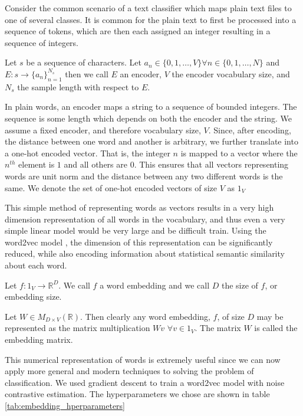 Consider the common scenario of a text classifier which maps plain text files to one of several classes.  It is common for the plain text to first be processed into a sequence of tokens, which are then each assigned an integer resulting in a sequence of integers.

\begin{definition}
Let $s$ be a sequence of characters.  Let $a_n \in \{0,1,\dots,V\} \forall n \in \{0,1,\dots,N\}$ and $E:s\rightarrow \{a_n\}_{n=1}^{N_s}$ then we call $E$ an encoder, $V$ the encoder vocabulary size, and $N_s$ the sample length with respect to $E$.
\end{definition}

In plain words, an encoder maps a string to a sequence of bounded integers.  The sequence is some length which depends on both the encoder and the string.  We assume a fixed encoder, and therefore vocabulary size, $V$.  Since, after encoding, the distance between one word and another is arbitrary, we further translate into a one-hot encoded vector.  That is, the integer $n$ is mapped to a vector where the $n^{th}$ element is $1$ and all others are $0$.  This ensures that all vectors representing words are unit norm and the distance between any two different words is the same.  We denote the set of one-hot encoded vectors of size $V$ as $1_V$

This simple method of representing words as vectors results in a very high dimension representation of all words in the vocabulary, and thus even a very simple linear model would be very large and be difficult train.  Using the word2vec model \cite{tm13}, the dimension of this representation can be significantly reduced, while also encoding information about statistical semantic similarity about each word.

\begin{definition}
Let $f: 1_V \rightarrow \mathbb{R}^D$.  We call $f$ a word embedding and we call $D$ the size of $f$, or embedding size.
\end{definition}

\noindent
Let $W \in M_{D\times V}(\mathbb{R})$.  Then clearly any word embedding, $f$, of size $D$ may be represented as the matrix multiplication $Wv$ $\forall v \in 1_V$.  The matrix $W$ is called the embedding matrix.

This numerical representation of words is extremely useful since we can now apply more general and modern techniques to solving the problem of classification.  We used gradient descent to train a word2vec model with noise contrastive estimation.  The hyperparameters we chose are shown in table \ref{tab:embedding_hperparameters}

